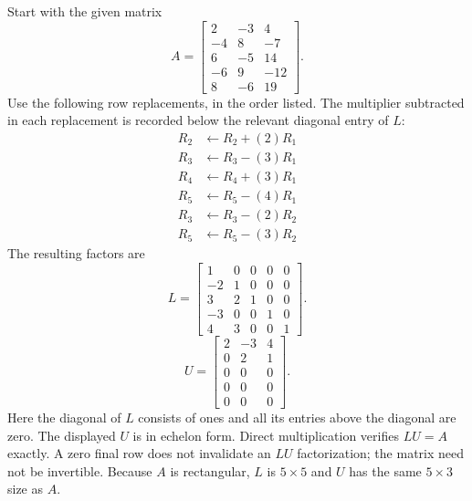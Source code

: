 Start with the given matrix
\[A=\left[\begin{matrix}2 & -3 & 4\\-4 & 8 & -7\\6 & -5 & 14\\-6 & 9 & -12\\8 & -6 & 19\end{matrix}\right].\]
Use the following row replacements, in the order listed. The multiplier
subtracted in each replacement is recorded below the relevant diagonal
entry of $L$:
\begin{align*}R_{2}&\leftarrow R_{2}+(2)R_{1}\\
R_{3}&\leftarrow R_{3}-(3)R_{1}\\
R_{4}&\leftarrow R_{4}+(3)R_{1}\\
R_{5}&\leftarrow R_{5}-(4)R_{1}\\
R_{3}&\leftarrow R_{3}-(2)R_{2}\\
R_{5}&\leftarrow R_{5}-(3)R_{2}\end{align*}The resulting factors are
\[L=\left[\begin{matrix}1 & 0 & 0 & 0 & 0\\-2 & 1 & 0 & 0 & 0\\3 & 2 & 1 & 0 & 0\\-3 & 0 & 0 & 1 & 0\\4 & 3 & 0 & 0 & 1\end{matrix}\right].\]
\[U=\left[\begin{matrix}2 & -3 & 4\\0 & 2 & 1\\0 & 0 & 0\\0 & 0 & 0\\0 & 0 & 0\end{matrix}\right].\]Here the diagonal of $L$ consists of ones and all its entries above
the diagonal are zero. The displayed $U$ is in echelon form.
Direct multiplication verifies $LU=A$ exactly. A zero final row does not
invalidate an $LU$ factorization; the matrix need not be invertible. Because $A$ is rectangular, $L$ is
$5\times5$ and $U$ has the same
$5\times3$ size as $A$.

